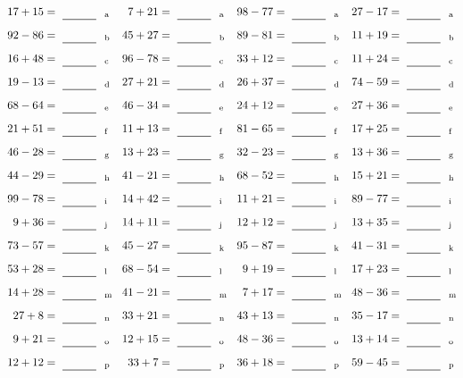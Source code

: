 \documentclass
[
  draft    = true,
  fontsize = 11pt,
  parskip  = half-
]
{scrartcl}
\begin{document}
\clearpage
\begin{align*}
    \pline{17+15}&=\rline{a}
  & \pline{7+21}&=\rline{a}
  & \pline{98-77}&=\rline{a}
  & \pline{27-17}&=\rline{a} \\[1ex]
    \pline{92-86}&=\rline{b}
  & \pline{45+27}&=\rline{b}
  & \pline{89-81}&=\rline{b}
  & \pline{11+19}&=\rline{b} \\[1ex]
    \pline{16+48}&=\rline{c}
  & \pline{96-78}&=\rline{c}
  & \pline{33+12}&=\rline{c}
  & \pline{11+24}&=\rline{c} \\[1ex]
    \pline{19-13}&=\rline{d}
  & \pline{27+21}&=\rline{d}
  & \pline{26+37}&=\rline{d}
  & \pline{74-59}&=\rline{d} \\[1ex]
    \pline{68-64}&=\rline{e}
  & \pline{46-34}&=\rline{e}
  & \pline{24+12}&=\rline{e}
  & \pline{27+36}&=\rline{e} \\[1ex]
    \pline{21+51}&=\rline{f}
  & \pline{11+13}&=\rline{f}
  & \pline{81-65}&=\rline{f}
  & \pline{17+25}&=\rline{f} \\[1ex]
    \pline{46-28}&=\rline{g}
  & \pline{13+23}&=\rline{g}
  & \pline{32-23}&=\rline{g}
  & \pline{13+36}&=\rline{g} \\[1ex]
    \pline{44-29}&=\rline{h}
  & \pline{41-21}&=\rline{h}
  & \pline{68-52}&=\rline{h}
  & \pline{15+21}&=\rline{h} \\[1ex]
    \pline{99-78}&=\rline{i}
  & \pline{14+42}&=\rline{i}
  & \pline{11+21}&=\rline{i}
  & \pline{89-77}&=\rline{i} \\[1ex]
    \pline{9+36}&=\rline{j}
  & \pline{14+11}&=\rline{j}
  & \pline{12+12}&=\rline{j}
  & \pline{13+35}&=\rline{j} \\[1ex]
    \pline{73-57}&=\rline{k}
  & \pline{45-27}&=\rline{k}
  & \pline{95-87}&=\rline{k}
  & \pline{41-31}&=\rline{k} \\[1ex]
    \pline{53+28}&=\rline{l}
  & \pline{68-54}&=\rline{l}
  & \pline{9+19}&=\rline{l}
  & \pline{17+23}&=\rline{l} \\[1ex]
    \pline{14+28}&=\rline{m}
  & \pline{41-21}&=\rline{m}
  & \pline{7+17}&=\rline{m}
  & \pline{48-36}&=\rline{m} \\[1ex]
    \pline{27+8}&=\rline{n}
  & \pline{33+21}&=\rline{n}
  & \pline{43+13}&=\rline{n}
  & \pline{35-17}&=\rline{n} \\[1ex]
    \pline{9+21}&=\rline{o}
  & \pline{12+15}&=\rline{o}
  & \pline{48-36}&=\rline{o}
  & \pline{13+14}&=\rline{o} \\[1ex]
    \pline{12+12}&=\rline{p}
  & \pline{33+7}&=\rline{p}
  & \pline{36+18}&=\rline{p}
  & \pline{59-45}&=\rline{p}
\end{align*}
\end{document}
